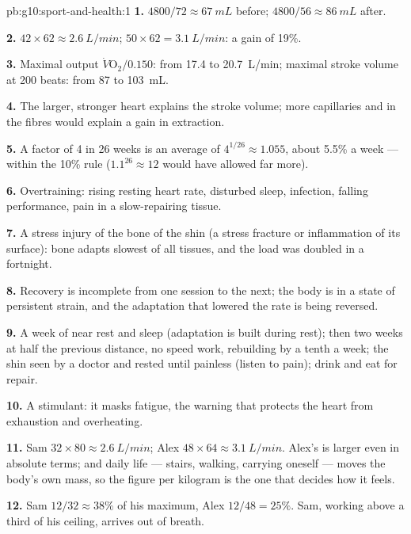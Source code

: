 \begin{solution}{pb:g10:sport-and-health:1}
\textbf{1.} $4800/72 \approx \qty{67}{mL}$ before; $4800/56 \approx
\qty{86}{mL}$ after.

\textbf{2.} $42 \times 62 \approx \qty{2.6}{L/min}$; $50 \times 62 =
\qty{3.1}{L/min}$: a gain of 19\%.

\textbf{3.} Maximal output $\dot V\!\mathrm{O_2}/0.150$: from
\num{17.4} to \qty{20.7}{L/min}; maximal stroke volume at 200 beats:
from \num{87} to \qty{103}{mL}.

\textbf{4.} The larger, stronger heart explains the stroke volume;
more capillaries and  in the fibres would explain a gain
in extraction.

\textbf{5.} A factor of 4 in 26 weeks is an average of $4^{1/26}
\approx 1.055$, about 5.5\% a week --- within the 10\% rule ($1.1^{26}
\approx 12$ would have allowed far more).

\textbf{6.} Overtraining: rising resting heart rate, disturbed sleep,
infection, falling performance, pain in a slow-repairing tissue.

\textbf{7.} A stress injury of the bone of the shin (a stress
fracture or inflammation of its surface): bone adapts slowest of all
tissues, and the load was doubled in a fortnight.

\textbf{8.} Recovery is incomplete from one session to the next; the
body is in a state of persistent strain, and the adaptation that
lowered the rate is being reversed.

\textbf{9.} A week of near rest and sleep (adaptation is built during
rest); then two weeks at half the previous distance, no speed work,
rebuilding by a tenth a week; the shin seen by a doctor and rested
until painless (listen to pain); drink and eat for repair.

\textbf{10.} A stimulant: it masks fatigue, the warning that protects
the heart from exhaustion and overheating.

\textbf{11.} Sam $32 \times 80 \approx \qty{2.6}{L/min}$; Alex $48
\times 64 \approx \qty{3.1}{L/min}$. Alex's is larger even in absolute
terms; and daily life --- stairs, walking, carrying oneself --- moves
the body's own mass, so the figure per kilogram is the one that
decides how it feels.

\textbf{12.} Sam $12/32 \approx 38\%$ of his maximum, Alex $12/48 =
25\%$. Sam, working above a third of his ceiling, arrives out of
breath.


\end{solution}
